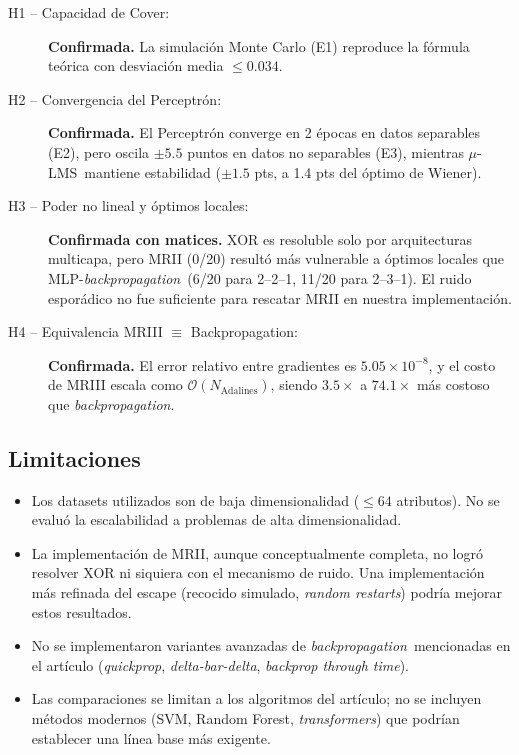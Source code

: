 \documentclass[11pt,a4paper]{article}
\newcommand{\muLMS}{$\mu$-LMS}
\newcommand{\bp}{\textit{backpropagation}}
\begin{document}
\begin{description}
    \item[H1 -- Capacidad de Cover:] \textbf{Confirmada.} La simulación Monte Carlo (E1) reproduce
    la fórmula teórica con desviación media $\leq 0.034$.
    \item[H2 -- Convergencia del Perceptrón:] \textbf{Confirmada.} El Perceptrón converge en 2
    épocas en datos separables (E2), pero oscila $\pm5.5$ puntos en datos no separables (E3),
    mientras \muLMS~mantiene estabilidad ($\pm1.5$ pts, a 1.4 pts del óptimo de Wiener).
    \item[H3 -- Poder no lineal y óptimos locales:] \textbf{Confirmada con matices.} XOR es
    resoluble solo por arquitecturas multicapa, pero MRII (0/20) resultó más vulnerable a óptimos
    locales que MLP-\bp~(6/20 para 2--2--1, 11/20 para 2--3--1). El ruido esporádico no fue
    suficiente para rescatar MRII en nuestra implementación.
    \item[H4 -- Equivalencia MRIII $\equiv$ Backpropagation:] \textbf{Confirmada.} El error
    relativo entre gradientes es $5.05 \times 10^{-8}$, y el costo de MRIII escala como
    $\mathcal{O}(N_{\text{Adalines}})$, siendo $3.5\times$ a $74.1\times$ más costoso que \bp.
\end{description}

\subsection{Limitaciones}

\begin{itemize}[leftmargin=*]
    \item Los datasets utilizados son de baja dimensionalidad ($\leq 64$ atributos). No se evaluó
    la escalabilidad a problemas de alta dimensionalidad.
    \item La implementación de MRII, aunque conceptualmente completa, no logró resolver XOR ni
    siquiera con el mecanismo de ruido. Una implementación más refinada del escape (recocido
    simulado, \textit{random restarts}) podría mejorar estos resultados.
    \item No se implementaron variantes avanzadas de \bp~mencionadas en el artículo
    (\textit{quickprop}, \textit{delta-bar-delta}, \textit{backprop through time}).
    \item Las comparaciones se limitan a los algoritmos del artículo; no se incluyen métodos
    modernos (SVM, Random Forest, \textit{transformers}) que podrían establecer una línea base
    más exigente.
\end{itemize}
\end{document}
